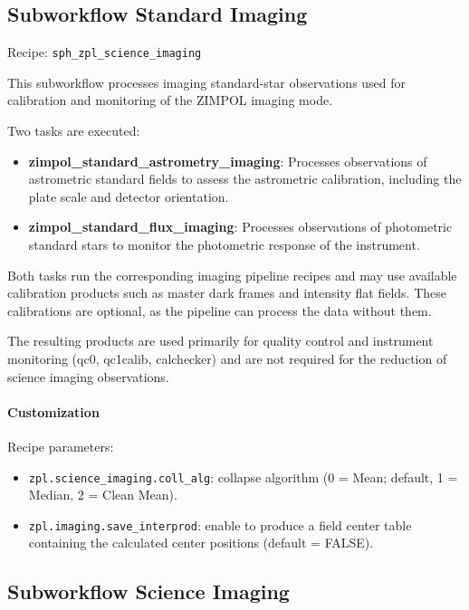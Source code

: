 \subsection{Subworkflow Standard Imaging}

Recipe: \texttt{sph\_zpl\_science\_imaging}

This subworkflow processes imaging standard-star observations used for calibration
and monitoring of the ZIMPOL imaging mode.

Two tasks are executed:
\begin{itemize}
\item \textbf{zimpol\_standard\_astrometry\_imaging}: Processes observations of astrometric standard fields
to assess the astrometric calibration, including the plate scale and detector orientation.
\item \textbf{zimpol\_standard\_flux\_imaging}: Processes observations of photometric standard stars to monitor
the photometric response of the instrument.
\end{itemize}

Both tasks run the corresponding imaging pipeline recipes and may use available calibration products
such as master dark frames and intensity flat fields.
These calibrations are optional, as the pipeline can process the data without them.

The resulting products are used primarily for quality control and instrument monitoring
(qc0, qc1calib, calchecker) and are not required for the reduction of science imaging observations.

\paragraph{Customization}

Recipe parameters:
\begin{itemize}
\item \texttt{zpl.science\_imaging.coll\_alg}: collapse algorithm
(0 = Mean; default, 1 = Median, 2 = Clean Mean).
\item \texttt{zpl.imaging.save\_interprod}: enable to produce
a field center table containing the calculated center positions (default = FALSE).
\end{itemize}

\subsection{Subworkflow Science Imaging}

